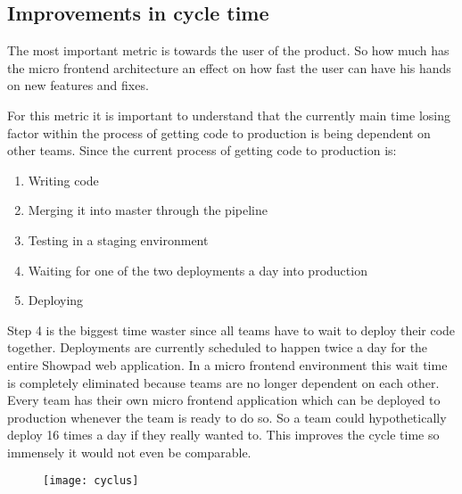\subsection{Improvements in cycle time}
The most important metric is towards the user of the product. So how much has the micro frontend architecture an effect on how fast the user can have his hands on new features and fixes. 

For this metric it is important to understand that the currently main time losing factor within the process of getting code to production is being dependent on other teams. Since the current process of getting code to production is:

\begin{enumerate}
\item Writing code
\item Merging it into master through the pipeline
\item Testing in a staging environment
\item Waiting for one of the two deployments a day into production
\item Deploying
\end{enumerate}

Step 4 is the biggest time waster since all teams have to wait to deploy their code together. Deployments are currently scheduled to happen twice a day for the entire Showpad web application. In a micro frontend environment this wait time is completely eliminated because teams are no longer dependent on each other. Every team has their own micro frontend application which can be deployed to production whenever the team is ready to do so. So a team could hypothetically deploy 16 times a day if they really wanted to. This improves the cycle time so immensely it would not even be comparable.

\begin{figure}[!h]
    \texttt{[image: cyclus]}
    \centering
\end{figure}
